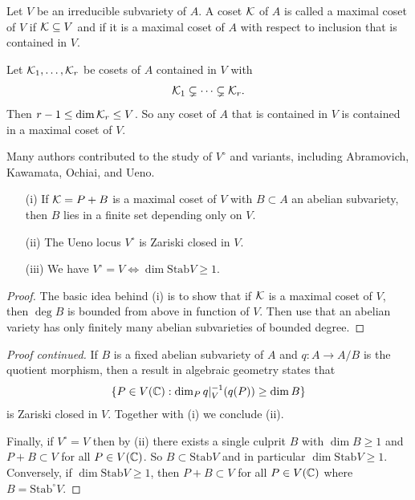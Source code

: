\documentclass{beamer}
\begin{document}
\begin{frame}
  \begin{definition}
    Let $V$ be an irreducible subvariety of $A$. A coset ${\mathcal K}$ of $A$ is
    called a \alert{maximal coset} of $V$ if ${\mathcal K}\subseteq V$ and if it is
    a maximal coset of $A$ with respect to inclusion that is contained
    in $V$. 
  \end{definition}

  Let ${\mathcal K}_1,\ldots,{\mathcal K}_r$ be cosets of $A$ contained in $V$ with
  $${\mathcal K}_1\subsetneq \cdots\subsetneq {\mathcal K}_r.$$
  Then $r-1\le \dim {\mathcal K}_r\le V$. So
  any coset  of $A$ that is contained in $V$ is contained in a maximal
  coset of $V$.
\end{frame}

\begin{frame}
  Many authors contributed to the study of $V^{\circ}$ and variants, including
  Abramovich, Kawamata, Ochiai, and Ueno.

  
  \begin{theorem} 
    \begin{enumerate}
    \item [(i)] If ${\mathcal K}=P+B$ is a \alert{maximal} coset of $V$ with $B\subset
      A$ an abelian subvariety, then $B$ lies in a finite set
      depending only on $V$. 
    \item[(ii)] The Ueno locus $V^{\circ}$ is \alert{Zariski closed} in $V$.
    \item[(iii)] We have $V^{\circ} = V\Longleftrightarrow
      \dim\mathrm{Stab} V\ge
      1$. 
    \end{enumerate}
  \end{theorem}
  \begin{proof}\renewcommand{\qedsymbol}{}
    The basic idea behind (i) is to show that if ${\mathcal K}$ is a maximal
    coset of $V$, then $\deg B$ is bounded from above in function of
    $V$. Then use that an abelian variety has only finitely many
    abelian subvarieties of bounded degree. 
  \end{proof}
\end{frame}

\begin{frame}
  \begin{proof}[Proof continued]
    If $B$ is a fixed abelian subvariety of $A$ and $q\colon
    A\rightarrow A/B$ is the quotient morphism, then
    a result in algebraic geometry states that
    \begin{equation*}
      \{P\in V({\mathbb{C}}) :    \dim_P q|_{V}^{-1}(q(P)) \ge \dim B\}    
    \end{equation*}
    is Zariski closed in $V$. Together with (i) we conclude (ii).

    Finally, if $V^{\circ}=V$ then by (ii) there exists a single culprit $B$ with
    $\dim B\ge 1$ and 
    $P+B\subset V$ for all $P\in V({\mathbb{C}})$. So $B\subset
    \mathrm{Stab} V$ and in particular $\dim \mathrm{Stab}V\ge 1$.
    Conversely, if $\dim \mathrm{Stab} V \ge 1$, then $P+B\subset V$
    for all $P\in V({\mathbb{C}})$ where $B=\mathrm{Stab}^{\circ} V$. 
  \end{proof}
\end{frame}
\end{document}
